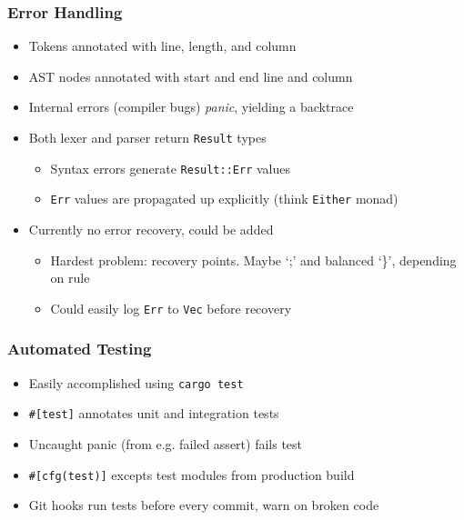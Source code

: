 \documentclass{article}
\begin{document}
\begin{frame}
    \frametitle{Error Handling}
    \begin{itemize}[<+(1)->]
        \item Tokens annotated with line, length, and column
        \item AST nodes annotated with start and end line and column
        \item Internal errors (compiler bugs) \textit{panic}, yielding a backtrace
        \item Both lexer and parser return \texttt{Result} types
            \begin{itemize}[<+(1)->]
                \item Syntax errors generate \texttt{Result::Err} values
                \item \texttt{Err} values are propagated up explicitly (think \texttt{Either}
                    monad)
            \end{itemize}
        \item Currently no error recovery, could be added
            \begin{itemize}[<+(1)->]
                \item Hardest problem: recovery points. Maybe `;' and balanced `\}', depending on rule
                \item Could easily log \texttt{Err} to \texttt{Vec} before
                    recovery
            \end{itemize}
    \end{itemize}
\end{frame}

\begin{frame}
    \frametitle{Automated Testing}
    \begin{itemize}[<+(1)->]
        \item Easily accomplished using \texttt{cargo test}
        \item \texttt{\#[test]} annotates unit and integration tests
        \item Uncaught panic (from e.g. failed assert) fails test
        \item \texttt{\#[cfg(test)]} excepts test modules from production build
        \item Git hooks run tests before every commit, warn on broken code
    \end{itemize}
\end{frame}
\end{document}
